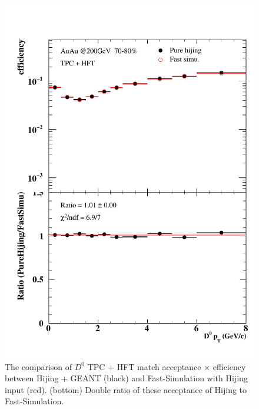 \begin{figure}[htbp]
\begin{minipage}[htbp]{0.47\linewidth}
\centering
\includegraphics[width=1.0\textwidth,angle=0]{figure/Run14_D0HFT/70_80_2_2.pdf}
\caption{ The comparison of $D^0$ TPC + HFT match acceptance $\times$ efficiency between Hijing + GEANT (black) and Fast-Simulation with Hijing input (red). (bottom) Double ratio of these acceptance of Hijing to Fast-Simulation.\label{70_80_2}}
\end{minipage}
\hfill
\end{figure}


